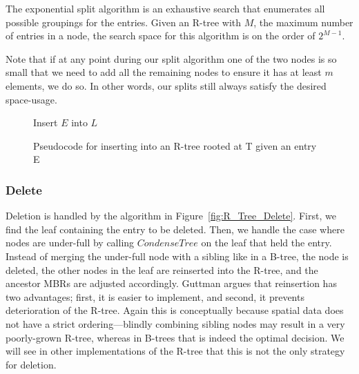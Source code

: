 The exponential split algorithm is an exhaustive search that enumerates all possible
groupings for the entries. Given an R-tree with $M$, the maximum number of entries
in a node, the search space for this algorithm is on the order of $2^{M-1}$.

Note that if at any point during our split algorithm one of the two nodes is so small
that we need to add all the remaining nodes to ensure it has at least $m$ elements,
we do so.
In other words, our splits still always satisfy the desired space-usage.

\begin{figure}[t]
\begin{algorithmic}
		\State {}
			\State Insert $E$ into $L$
		\Else
			\State {}
		\EndIf
		\State {}
	\EndFunction
\end{algorithmic}
\caption{Pseudocode for inserting into an R-tree rooted at T given an entry E}
\label{fig:R_Tree_Insert}
\end{figure}

\subsubsection{Delete}
Deletion is handled by the algorithm in Figure~\ref{fig:R_Tree_Delete}. First,
we find the leaf containing the entry to be deleted. Then, we handle the case
where nodes are under-full by calling $CondenseTree$ on the leaf that held
the entry. Instead of merging the under-full node with a sibling like in a 
B-tree, the node is deleted, the other nodes in the leaf are reinserted into 
the R-tree, and the ancestor MBRs are adjusted accordingly. Guttman argues that
reinsertion has two advantages; first, it is easier to implement, and second, 
it prevents deterioration of the R-tree.
Again this is conceptually because spatial data does not have a strict ordering---blindly combining sibling nodes
may result in a very poorly-grown R-tree, whereas in B-trees that is indeed the optimal decision.
We will see in other implementations
of the R-tree that this is not the only strategy for deletion.


